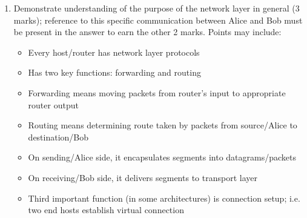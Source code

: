 {\begin{enumerate}[label=(\alph*)]
    \item Demonstrate understanding of the purpose of the network layer in general (3 marks); reference to this specific communication between Alice and Bob must be present in the answer to earn the other 2 marks. Points may include:
    \begin{itemize}
        \item Every host/router has network layer protocols
        \item Has two key functions: forwarding and routing
        \item Forwarding means moving packets from router’s input to appropriate router output
        \item Routing means determining route taken by packets from source/Alice to destination/Bob
        \item On sending/Alice side, it encapsulates segments into datagrams/packets
        \item On receiving/Bob side, it delivers segments to transport layer
        \item Third important function (in some architectures) is connection setup; i.e. two end hosts establish virtual connection
    \end{itemize}
\end{enumerate}
}

